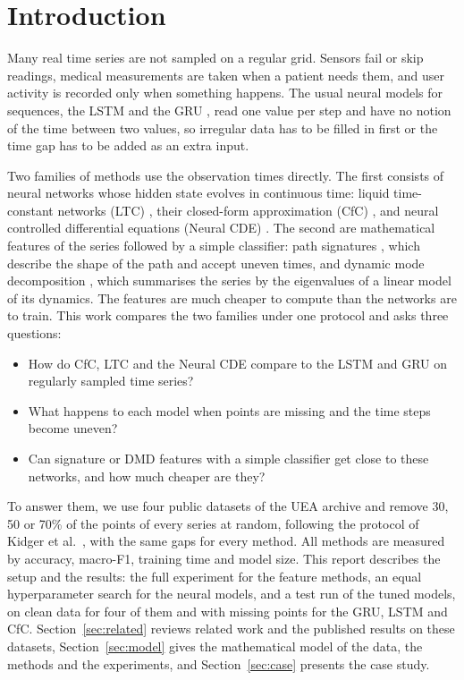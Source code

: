 \section{Introduction}\label{sec:intro}

Many real time series are not sampled on a regular grid. Sensors fail or
skip readings, medical measurements are taken when a patient needs them,
and user activity is recorded only when something happens. The usual
neural models for sequences, the LSTM \cite{hochreiter1997lstm} and the
GRU \cite{cho2014gru}, read one value per step and have no notion of the
time between two values, so irregular data has to be filled in first or
the time gap has to be added as an extra input.

Two families of methods use the observation times directly. The first
consists of neural networks whose hidden state evolves in continuous
time: liquid time-constant networks (LTC) \cite{hasani2021ltc}, their
closed-form approximation (CfC) \cite{hasani2022cfc}, and neural controlled
differential equations (Neural CDE) \cite{kidger2020ncde}. The second are
mathematical features of the series followed by a simple classifier: path
signatures \cite{chen1958integration, lyons2022sigml}, which describe the
shape of the path and accept uneven times, and dynamic mode decomposition
\cite{schmid2010dmd}, which summarises the series by the eigenvalues of a
linear model of its dynamics. The features are much cheaper to compute
than the networks are to train. This work compares the two families under
one protocol and asks three questions:
\begin{itemize}
\item[RQ1] How do CfC, LTC and the Neural CDE compare to the LSTM and GRU on
regularly sampled time series?
\item[RQ2] What happens to each model when points are missing and the time
steps become uneven?
\item[RQ3] Can signature or DMD features with a simple classifier get close
to these networks, and how much cheaper are they?
\end{itemize}

To answer them, we use four public datasets of the UEA archive
\cite{bagnall2018uea} and remove 30, 50 or 70\% of the points of every
series at random, following the protocol of Kidger et al.\
\cite{kidger2020ncde}, with the same gaps for every method. All methods
are measured by accuracy, macro-F1, training time and model size. This
report describes the setup and the results: the full experiment for the
feature methods, an equal hyperparameter search for the neural models,
and a test run of the tuned models, on clean data for four of them and
with missing points for the GRU, LSTM and CfC.
Section~\ref{sec:related} reviews related work and the published results
on these datasets, Section~\ref{sec:model} gives the mathematical model of
the data, the methods and the experiments, and Section~\ref{sec:case}
presents the case study.
